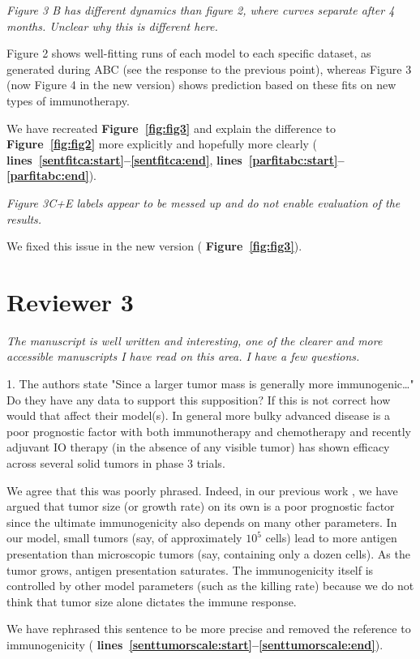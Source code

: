 \documentclass{article}
\newcommand{\revr}[1]{{\color{gray} \itshape #1}}
\newcommand{\auth}[1]{{#1}}
\newcommand{\chng}[1]{{\color{blue!70!black} #1}}
\newcommand{\myref}[2]{{\bfseries\color{red!70!black} Figure~\ref{#1}#2}}
\newcommand{\lr}[1]{{\bfseries\color{red!70!black} lines~\ref{#1:start}--\ref{#1:end}}}
\begin{document}
\revr{
Figure 3 B has different dynamics than figure 2, where curves separate after 4 months. Unclear why this is different here.
}

\auth{
Figure 2 shows well-fitting runs of each model to each specific dataset, as generated during ABC (see the response to the previous point), whereas Figure 3 (now Figure 4 in the new version) shows prediction based on these fits on new types of immunotherapy.
}

\chng{
We have recreated \myref{fig:fig3}{} and explain the difference to \myref{fig:fig2}{} more explicitly and hopefully more clearly (\lr{sentfitca},\lr{parfitabc}).}

\revr{
Figure 3C+E labels appear to be messed up and do not enable evaluation of the results.
}

\chng{We fixed this issue in the new version (\myref{fig:fig3}{}).}


\section*{Reviewer 3}

\revr{The manuscript is well written and interesting, one of the clearer and more accessible manuscripts I have read on this area. I have a few questions.

1. The authors state "Since a larger tumor mass is generally more immunogenic…" Do they have any data to support this supposition? If this is not correct how would that affect their model(s). In general more bulky advanced disease is a poor prognostic factor with both immunotherapy and chemotherapy and recently adjuvant IO therapy (in the absence of any visible tumor) has shown efficacy across several solid tumors in phase 3 trials.}

We agree that this was poorly phrased. Indeed, in our previous work \cite{Creemers2021}, we have argued that tumor size (or growth rate) on its own is a poor prognostic factor since the ultimate immunogenicity also depends on many other parameters. In our model, small tumors (say, of approximately $10^5$ cells) lead to more antigen presentation than microscopic tumors (say, containing only a dozen cells). As the tumor grows, antigen presentation saturates. The immunogenicity itself is controlled by other model parameters (such as the killing rate) because we do not think that tumor size alone dictates the immune response.

\chng{We have rephrased this sentence to be more precise and removed the reference to immunogenicity (\lr{senttumorscale}).}
\end{document}

